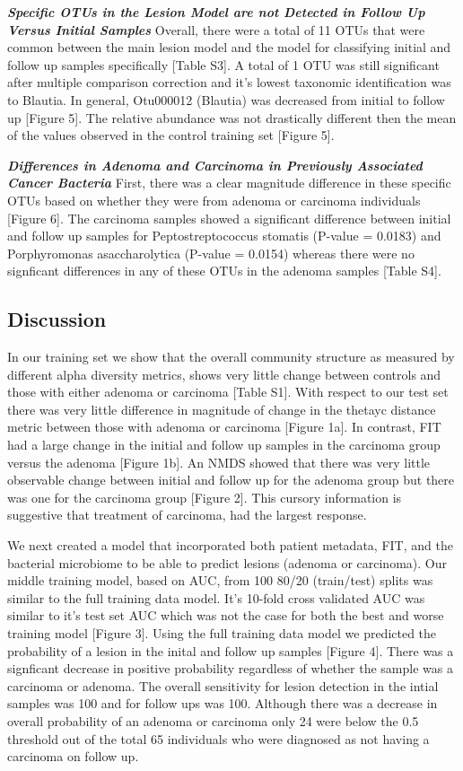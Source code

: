 \documentclass[12pt,]{article}
\begin{document}
\textbf{\emph{Specific OTUs in the Lesion Model are not Detected in
Follow Up Versus Initial Samples}} Overall, there were a total of 11
OTUs that were common between the main lesion model and the model for
classifying initial and follow up samples specifically {[}Table S3{]}. A
total of 1 OTU was still significant after multiple comparison
correction and it's lowest taxonomic identification was to Blautia. In
general, Otu000012 (Blautia) was decreased from initial to follow up
{[}Figure 5{]}. The relative abundance was not drastically different
then the mean of the values observed in the control training set
{[}Figure 5{]}.

\textbf{\emph{Differences in Adenoma and Carcinoma in Previously
Associated Cancer Bacteria}} First, there was a clear magnitude
difference in these specific OTUs based on whether they were from
adenoma or carcinoma individuals {[}Figure 6{]}. The carcinoma samples
showed a significant difference between initial and follow up samples
for Peptostreptococcus stomatis (P-value = 0.0183) and Porphyromonas
asaccharolytica (P-value = 0.0154) whereas there were no signficant
differences in any of these OTUs in the adenoma samples {[}Table S4{]}.

\newpage

\subsection{Discussion}\label{discussion}

In our training set we show that the overall community structure as
measured by different alpha diversity metrics, shows very little change
between controls and those with either adenoma or carcinoma {[}Table
S1{]}. With respect to our test set there was very little difference in
magnitude of change in the thetayc distance metric between those with
adenoma or carcinoma {[}Figure 1a{]}. In contrast, FIT had a large
change in the initial and follow up samples in the carcinoma group
versus the adenoma {[}Figure 1b{]}. An NMDS showed that there was very
little observable change between initial and follow up for the adenoma
group but there was one for the carcinoma group {[}Figure 2{]}. This
cursory information is suggestive that treatment of carcinoma, had the
largest response.

We next created a model that incorporated both patient metadata, FIT,
and the bacterial microbiome to be able to predict lesions (adenoma or
carcinoma). Our middle training model, based on AUC, from 100 80/20
(train/test) splits was similar to the full training data model. It's
10-fold cross validated AUC was similar to it's test set AUC which was
not the case for both the best and worse training model {[}Figure 3{]}.
Using the full training data model we predicted the probability of a
lesion in the inital and follow up samples {[}Figure 4{]}. There was a
signficant decrease in positive probability regardless of whether the
sample was a carcinoma or adenoma. The overall sensitivity for lesion
detection in the intial samples was 100 and for follow ups was 100.
Although there was a decrease in overall probability of an adenoma or
carcinoma only 24 were below the 0.5 threshold out of the total 65
individuals who were diagnosed as not having a carcinoma on follow up.
\end{document}

